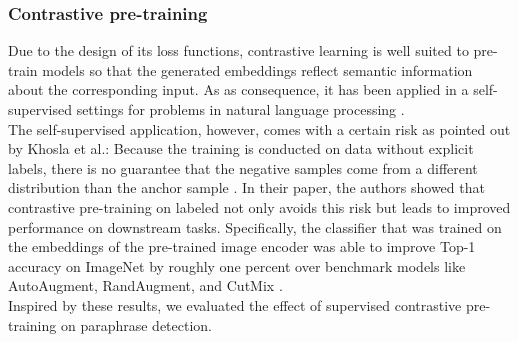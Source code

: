 \documentclass[11pt]{article}
\begin{document}
\subsubsection{Contrastive pre-training}
Due to the design of its loss functions, contrastive learning is well suited to pre-train models so that the generated embeddings reflect semantic information about the corresponding input.
As as consequence, it has been applied in a self-supervised settings for problems in natural language processing \cite{mikolov:2013, yang:2015, devlin:2018}.\\
The self-supervised application, however, comes with a certain risk as pointed out by Khosla et al.:
Because the training is conducted on data without explicit labels, there is no guarantee that the negative samples come from a different distribution than the anchor sample \cite{khosla:2020}.
In their paper, the authors showed that contrastive pre-training on labeled not only avoids this risk but leads to improved performance on downstream tasks.
Specifically, the classifier that was trained on the embeddings of the pre-trained image encoder was able to improve Top-1 accuracy on ImageNet by roughly one percent over benchmark models like AutoAugment, RandAugment, and CutMix \cite{cubuk:2018, cubuk:2019, yun:2019}.\\
Inspired by these results, we evaluated the effect of supervised contrastive pre-training on paraphrase detection.
\end{document}
